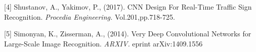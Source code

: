 \documentclass{article}
\begin{document}
[4] Shustanov, A., Yakimov, P., (2017). CNN Design For Real-Time Traffic Sign Recognition. {\it Procedia Engineering.} Vol.201,pp.718-725.

[5] Simonyan, K., Zisserman, A., (2014). Very Deep Convolutional Networks for Large-Scale Image Recognition. {\it ARXIV.} eprint arXiv:1409.1556


\end{document}

